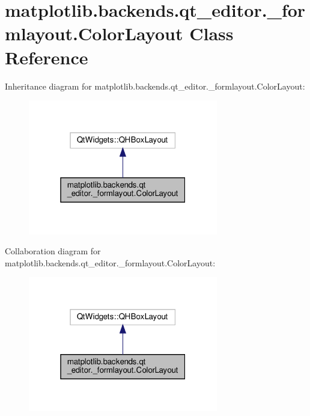 \hypertarget{classmatplotlib_1_1backends_1_1qt__editor_1_1__formlayout_1_1ColorLayout}{}\section{matplotlib.\+backends.\+qt\+\_\+editor.\+\_\+formlayout.\+Color\+Layout Class Reference}
\label{classmatplotlib_1_1backends_1_1qt__editor_1_1__formlayout_1_1ColorLayout}


Inheritance diagram for matplotlib.\+backends.\+qt\+\_\+editor.\+\_\+formlayout.\+Color\+Layout\+:
\nopagebreak
\begin{figure}[H]
\begin{center}
\leavevmode
\includegraphics[width=235pt]{classmatplotlib_1_1backends_1_1qt__editor_1_1__formlayout_1_1ColorLayout__inherit__graph}
\end{center}
\end{figure}


Collaboration diagram for matplotlib.\+backends.\+qt\+\_\+editor.\+\_\+formlayout.\+Color\+Layout\+:
\nopagebreak
\begin{figure}[H]
\begin{center}
\leavevmode
\includegraphics[width=235pt]{classmatplotlib_1_1backends_1_1qt__editor_1_1__formlayout_1_1ColorLayout__coll__graph}
\end{center}
\end{figure}
